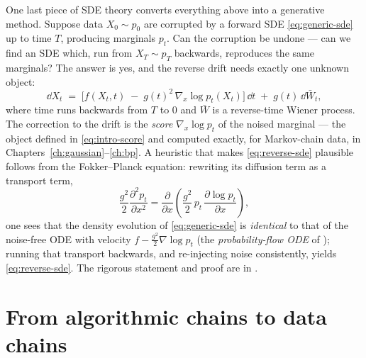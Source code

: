One last piece of SDE theory converts everything above into a generative
method. Suppose data $X_0 \sim p_0$ are corrupted by a forward SDE
\eqref{eq:generic-sde} up to time $T$, producing marginals $p_t$. Can the
corruption be undone --- can we find an SDE which, run from
$X_T \sim p_T$ backwards, reproduces the same marginals? The answer
\citep{anderson1982reverse} is yes, and the reverse drift needs exactly one
unknown object:
\begin{equation}
  \dd X_t \;=\;
  \Big[ f(X_t, t) \;-\; g(t)^2\, \nabla_x \log p_t(X_t) \Big]\,\dd t
  \;+\; g(t)\, \dd \bar W_t ,
  \label{eq:reverse-sde}
\end{equation}
where time runs backwards from $T$ to $0$ and $\bar W$ is a reverse-time
Wiener process. The correction to the drift is the \emph{score}
$\nabla_x \log p_t$ of the noised marginal --- the object defined in
\eqref{eq:intro-score} and computed exactly, for Markov-chain data,
in Chapters~\ref{ch:gaussian}--\ref{ch:bp}. A heuristic that makes
\eqref{eq:reverse-sde} plausible follows from the Fokker--Planck equation:
rewriting its diffusion term as a transport term,
\begin{equation*}
  \frac{g^2}{2} \frac{\partial^2 p_t}{\partial x^2}
  = \frac{\partial}{\partial x}\!\left(
      \frac{g^2}{2}\, p_t\, \frac{\partial \log p_t}{\partial x}
    \right),
\end{equation*}
one sees that the density evolution of \eqref{eq:generic-sde} is
\emph{identical} to that of the noise-free ODE with velocity
$f - \tfrac{g^2}{2} \nabla \log p_t$ (the \emph{probability-flow ODE} of
\citealp{song2021scorebased}); running that transport backwards, and
re-injecting noise consistently, yields \eqref{eq:reverse-sde}. The rigorous
statement and proof are in \citet{anderson1982reverse}.

\section{From algorithmic chains to data chains}

